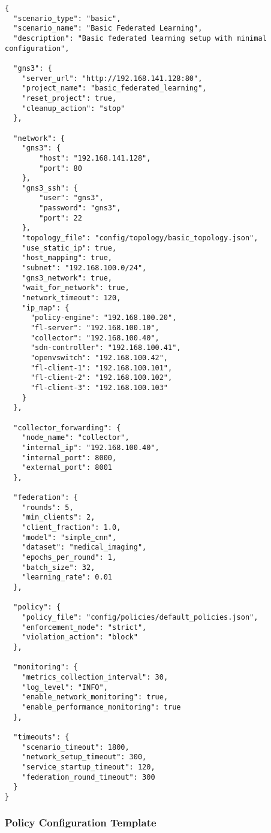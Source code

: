 \begin{lstlisting}[style=jsoncode, caption=Scenario Configuration Template]
{
  "scenario_type": "basic",
  "scenario_name": "Basic Federated Learning",
  "description": "Basic federated learning setup with minimal configuration",
  
  "gns3": {
    "server_url": "http://192.168.141.128:80",
    "project_name": "basic_federated_learning",
    "reset_project": true,
    "cleanup_action": "stop"
  },
  
  "network": {
    "gns3": {
        "host": "192.168.141.128", 
        "port": 80 
    },
    "gns3_ssh": { 
        "user": "gns3", 
        "password": "gns3", 
        "port": 22 
    },
    "topology_file": "config/topology/basic_topology.json",
    "use_static_ip": true,
    "host_mapping": true,
    "subnet": "192.168.100.0/24",
    "gns3_network": true,
    "wait_for_network": true,
    "network_timeout": 120,
    "ip_map": {
      "policy-engine": "192.168.100.20",
      "fl-server": "192.168.100.10",
      "collector": "192.168.100.40",
      "sdn-controller": "192.168.100.41",
      "openvswitch": "192.168.100.42",
      "fl-client-1": "192.168.100.101",
      "fl-client-2": "192.168.100.102",
      "fl-client-3": "192.168.100.103"
    }
  },

  "collector_forwarding": {
    "node_name": "collector",
    "internal_ip": "192.168.100.40", 
    "internal_port": 8000, 
    "external_port": 8001  
  },
  
  "federation": {
    "rounds": 5,
    "min_clients": 2,
    "client_fraction": 1.0,
    "model": "simple_cnn",
    "dataset": "medical_imaging",
    "epochs_per_round": 1,
    "batch_size": 32,
    "learning_rate": 0.01
  },
  
  "policy": {
    "policy_file": "config/policies/default_policies.json",
    "enforcement_mode": "strict",
    "violation_action": "block"
  },
  
  "monitoring": {
    "metrics_collection_interval": 30,
    "log_level": "INFO",
    "enable_network_monitoring": true,
    "enable_performance_monitoring": true
  },
  
  "timeouts": {
    "scenario_timeout": 1800,
    "network_setup_timeout": 300,
    "service_startup_timeout": 120,
    "federation_round_timeout": 300
  }
}
\end{lstlisting}

\subsubsection{Policy Configuration Template}

